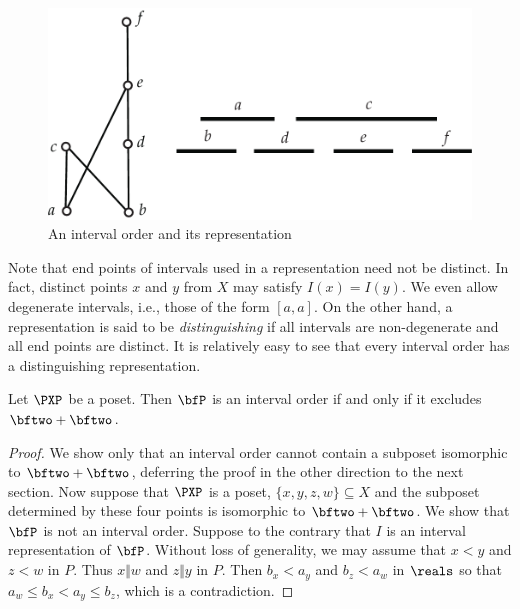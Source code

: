 \begin{figure}
\begin{center}
\includegraphics*[scale=.4]{posets-figs/6ptintorder.pdf}
\caption{An interval order and its representation}
\label{fig:6ptintorder} 
\end{center}
\end{figure}

Note that end points of intervals used in a representation need not be
distinct.  In fact, distinct points $x$ and $y$ from $X$ may satisfy
$I(x)=I(y)$.  We even allow degenerate intervals, i.e., those of the
form $[a,a]$.  On the other hand, a representation is said to be
\textit{distinguishing} if all intervals are non-degenerate and all
end points are distinct. It is relatively easy to see that every interval order
has a distinguishing representation.

\begin{theorem}[Fishburn]\label{thm:fishburn}
Let $\PXP$ be a poset.  Then $\bfP$ is an interval order if 
and only if it excludes $\bftwo+\bftwo$.
\end{theorem}

\begin{proof}
We show only that an interval order cannot contain a subposet
isomorphic to $\bftwo+\bftwo$, deferring the proof in the other 
direction to the next section.  Now suppose that $\PXP$ is a poset,
$\{x,y,z,w\}\subseteq X$ and the subposet
determined by these four points is isomorphic to $\bftwo+\bftwo$.
We show that $\bfP$ is not an interval order.  Suppose to the
contrary that $I$  is an interval representation of $\bfP$.  Without loss 
of generality, we may assume that $x<y$ and $z<w$ in $P$.  Thus $x\Vert w$ and
$z\Vert y$ in $P$.  Then $b_x<a_y$ and $b_z < a_w$ in $\reals$ 
so that $a_w \le b_x <a_y \le b_z$, which is a contradiction.

\end{proof}

